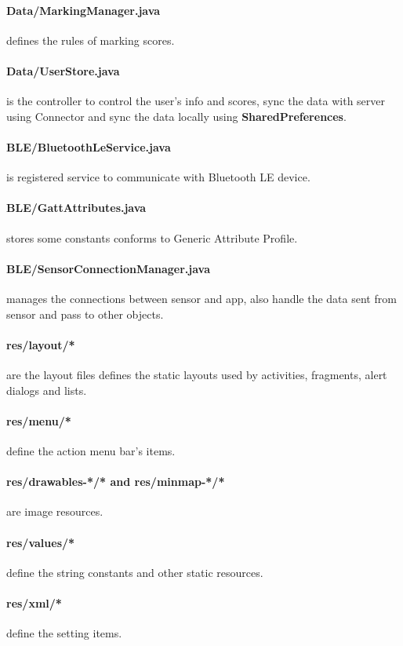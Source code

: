 \documentclass[10pt,a4paper,final]{scrartcl}
\begin{document}
\paragraph{Data/MarkingManager.java} defines the rules of marking scores.
\paragraph{Data/UserStore.java} is the controller to control the user's info and scores, sync the data with server using Connector and sync the data locally using {\bf SharedPreferences}.
\paragraph{BLE/BluetoothLeService.java} is registered service to communicate with Bluetooth LE device.
\paragraph{BLE/GattAttributes.java} stores some constants conforms to Generic Attribute Profile.
\paragraph{BLE/SensorConnectionManager.java} manages the connections between sensor and app, also handle the data sent from sensor and pass to other objects.


\paragraph{res/layout/*} are the layout files defines the static layouts used by activities, fragments, alert dialogs and lists.
\paragraph{res/menu/*} define the action menu bar's items.
\paragraph{res/drawables-*/* and res/minmap-*/*} are image resources.
\paragraph{res/values/*} define the string constants and other static resources.
\paragraph{res/xml/*} define the setting items.
\end{document}
